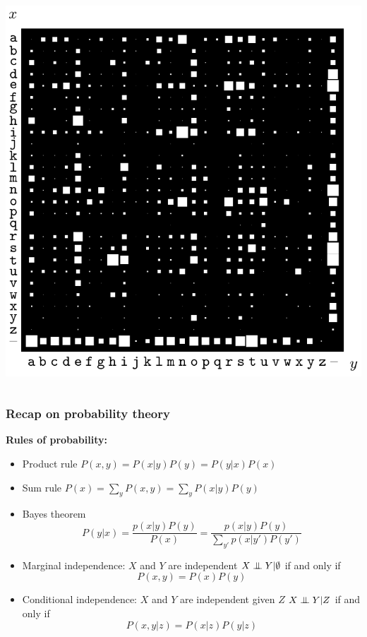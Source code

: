 \documentclass{beamer}
\newcommand{\bis}{\begin{itemize}[<+->]}
\newcommand{\eis}{\end{itemize}}
\newcommand{\indep}{\ensuremath{\perp\mkern -10mu \perp}}
\begin{document}
\begin{frame}
\begin{columns}
   \includegraphics[width=\textwidth]{e2}
  \end{columns}
\end{frame}

\begin{frame}
	\frametitle{Recap on probability theory}
    \textbf{Rules of probability:}
    \bis
    \item Product rule
    $P(x,y)=P(x|y)P(y)=P(y|x)P(x)$
    \item Sum rule
    $P(x)=\sum_y P(x,y) = \sum_y P(x|y)P(y)$
    \item Bayes theorem
    $$P(y|x)=\frac{p(x|y)P(y)}{P(x)}
        =\frac{p(x|y)P(y)}{\sum_{y'}p(x|y')P(y')}$$
    \item Marginal independence: $X$ and $Y$ are independent $X\indep Y|\emptyset$ if and only if
    $$P(x,y)=P(x)P(y)$$
    \item Conditional independence: $X$ and $Y$ are independent given $Z$ 
    $X\indep Y|Z$ if and only if
    $$P(x,y|z)=P(x|z)P(y|z)$$
    \eis
\end{frame}
\end{document}
